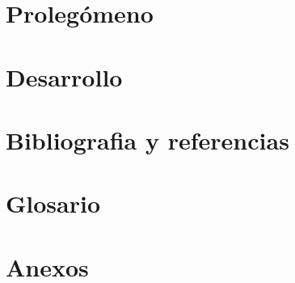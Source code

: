 \documentclass[spanish,a4paper,11pt]{book}
\begin{document}
\renewcommand{\figurename}{Figura}
\renewcommand{\listfigurename}{Indice de figuras}
\renewcommand{\tablename}{Tabla}
\renewcommand{\listtablename}{Indice de tablas}

\pagestyle{empty}

\cleardoublepage


\cleardoublepage
\pagestyle{plain}

\frontmatter %


\cleardoublepage

\tableofcontents
\listoffigures
\listoftables

\mainmatter %


\chapter{Prolegómeno}


\chapter{Desarrollo}


%

\backmatter %

\clearpage
{}
\chapter*{Bibliografia y referencias}
\nocite{*}
\printbibliography[heading=none]
\newpage

\chapter*{Glosario}


\chapter*{Anexos}



\end{document}

